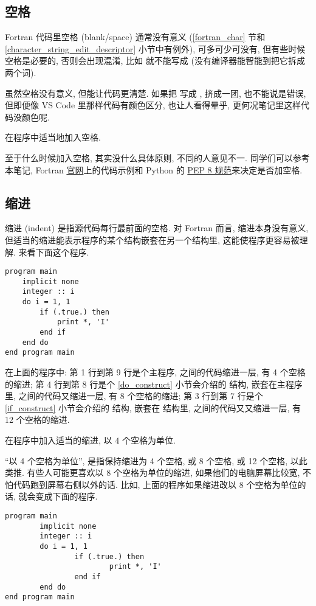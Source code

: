 \subsection{空格}

Fortran 代码里空格 (blank/space) 通常没有意义 (\ref{fortran_char} 节和 \ref{character_string_edit_descriptor} 小节中有例外), 可多可少可没有, 但有些时候空格是必要的, 否则会出现混淆, 比如  就不能写成  (没有编译器能智能到把它拆成两个词).

虽然空格没有意义, 但能让代码更清楚. 如果把  写成 , 挤成一团, 也不能说是错误, 但即便像 VS Code 里那样代码有颜色区分, 也让人看得晕乎, 更何况笔记里这样代码没颜色呢.
\begin{convention}
    在程序中适当地加入空格.\label{fortran_blank}
\end{convention}
至于什么时候加入空格, 其实没什么具体原则, 不同的人意见不一. 同学们可以参考本笔记,  Fortran \href{https://fortran-lang.org/}{官网}上的代码示例和 Python 的 \href{https://peps.python.org/pep-0008/}{PEP 8 规范}来决定是否加空格.

\subsection{缩进}\label{indent}

缩进 (indent) 是指源代码每行最前面的空格. 对 Fortran 而言, 缩进本身没有意义, 但适当的缩进能表示程序的某个结构嵌套在另一个结构里, 这能使程序更容易被理解. 来看下面这个程序.
\begin{lstlisting}
program main
    implicit none
    integer :: i
    do i = 1, 1
        if (.true.) then
            print *, 'I'
        end if
    end do
end program main
\end{lstlisting}
在上面的程序中: 第 1 行到第 9 行是个主程序, 之间的代码缩进一层, 有 4 个空格的缩进; 第 4 行到第 8 行是个 \ref{do_construct} 小节会介绍的  结构, 嵌套在主程序里, 之间的代码又缩进一层, 有 8 个空格的缩进; 第 3 行到第 7 行是个 \ref{if_construct} 小节会介绍的  结构, 嵌套在  结构里, 之间的代码又又缩进一层, 有 12 个空格的缩进.
\begin{convention}
    在程序中加入适当的缩进, 以 $4$ 个空格为单位.\label{fortran_indent}
\end{convention}
``以 4 个空格为单位'', 是指保持缩进为 4 个空格, 或 8 个空格, 或 12 个空格, 以此类推. 有些人可能更喜欢以 8 个空格为单位的缩进, 如果他们的电脑屏幕比较宽, 不怕代码跑到屏幕右侧以外的话. 比如, 上面的程序如果缩进改以 8 个空格为单位的话, 就会变成下面的程序.
\begin{lstlisting}
program main
        implicit none
        integer :: i
        do i = 1, 1
                if (.true.) then
                        print *, 'I'
                end if
        end do
end program main
\end{lstlisting}

